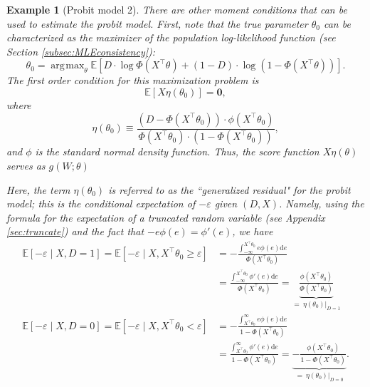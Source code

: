 \documentclass[10.5pt, A4paper, openany, uplatex]{book}
\newcommand{\mbf}{\mathbf}
\newcommand{\mrm}{\mathrm}
\newcommand{\eps}{\varepsilon}
\newcommand{\E}{\mathbb{E}}
\newtheorem{example}[theorem]{Example}
\numberwithin{equation}{section}
\DeclareMathOperator*{\argmax}{\arg\!\max}
\begin{document}
\begin{example}[Probit model 2]\label{ex:prob2}\upshape
	There are other moment conditions that can be used to estimate the probit model.
	First, note that the true parameter $\theta_0$  can be characterized as the maximizer of the population log-likelihood function (see Section \ref{subsec:MLEconsistency}):
	\[
		\theta_0 = \argmax_\theta \E\left[ D \cdot \log \Phi(X^\top \theta) + (1 - D) \cdot \log (1 - \Phi(X^\top \theta ) )  \right].
	\]
	The first order condition for this maximization problem is
	\[
		\E\left[ X  \eta(\theta_0) \right] = \mbf{0},
	\]
	where
	\[
		\eta(\theta_0) \equiv \frac{(D - \Phi(X^\top \theta_0)) \cdot \phi(X ^\top \theta_0)}{\Phi(X^\top \theta_0) \cdot (1 - \Phi(X^\top \theta_0) )},
	\]
	and $\phi$ is the standard normal density function.
	Thus, the score function $X  \eta(\theta)$ serves as $g(W; \theta)$
	
	Here, the term $\eta(\theta_0)$ is referred to as the ``generalized residual" for the probit model; this is the conditional expectation of $-\eps$ given $(D, X)$.
	Namely, using the formula for the expectation of a truncated random variable (see Appendix \ref{sec:truncate}) and the fact  that $-e\phi(e) = \phi'(e)$, we have
	\begin{align*}
		\E[-\eps \mid X, D = 1] = \E[-\eps \mid X, X^\top\theta_0 \geq \eps] 
		& = -\frac{\int_{-\infty}^{X^\top\theta_0} e \phi(e) \mrm{d}e}{\Phi(X^\top\theta_0)} \\
		& =  \frac{ \int_{-\infty}^{X^\top\theta_0} \phi'(e) \mrm{d}e}{\Phi(X^\top\theta_0)} = \underbrace{\frac{ \phi(X^\top \theta_0)}{\Phi(X^\top\theta_0)}}_{= \: \eta(\theta_0)|_{D = 1}}\\
		\E[-\eps \mid X, D = 0] = \E[-\eps \mid X, X^\top\theta_0 < \eps] 
		& = - \frac{\int_{X^\top\theta_0}^\infty e \phi(e) \mrm{d}e}{1 - \Phi(X^\top\theta_0)} \\
		& = \frac{ \int_{X^\top\theta_0}^\infty \phi'(e) \mrm{d}e}{1- \Phi(X^\top\theta_0)} = \underbrace{-\frac{ \phi(X^\top \theta_0)}{1- \Phi(X^\top\theta_0)}}_{= \: \eta(\theta_0)|_{D = 0}}.
	\end{align*}
\end{example}
\end{document}
